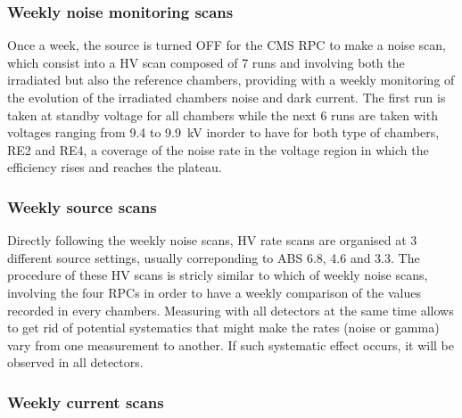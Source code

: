 		\subsubsection{Weekly noise monitoring scans}
		\label{chapt5:sssec:noisescan}
		
	Once a week, the source is turned OFF for the CMS RPC to make a noise scan, which consist into a HV scan composed of 7 runs and involving both the irradiated but also the reference chambers, providing with a weekly monitoring of the evolution of the irradiated chambers noise and dark current. The first run is taken at standby voltage for all chambers while the next 6 runs are taken with voltages ranging from 9.4 to \SI{9.9}{kV} inorder to have for both type of chambers, RE2 and RE4, a coverage of the noise rate in the voltage region in which the efficiency rises and reaches the plateau.
	
		\subsubsection{Weekly source scans}
		\label{chapt5:sssec:sourcescan}
		
	Directly following the weekly noise scans, HV rate scans are organised at 3 different source settings, usually correponding to ABS 6.8, 4.6 and 3.3. The procedure of these HV scans is stricly similar to which of weekly noise scans, involving the four RPCs in order to have a weekly comparison of the values recorded in every chambers. Measuring with all detectors at the same time allows to get rid of potential systematics that might make the rates (noise or gamma) vary from one measurement to another. If such systematic effect occurs, it will be observed in all detectors.
	
		\subsubsection{Weekly current scans}
		\label{chapt5:sssec:currentscan}
		
